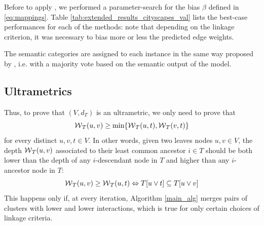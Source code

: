 Before to apply \algname{}, we performed a parameter-search for the bias $\beta$ defined in \ref{eq:mappings}. Table \ref{tab:extended_results_cityscapes_val} lists the best-case performances for each of the methods: note that depending on the \algname{} linkage criterion, it was necessary to bias more or less the predicted edge weights.

The semantic categories are assigned to each instance in the same way proposed by \cite{liu2018affinity}, i.e. with a majority vote based on the semantic output of the model.


\subsection{Ultrametrics} 
Thus, to prove that $(V, d_{T})$ is an ultrametric, we only need to prove that
\begin{equation}
\mathcal{W}{}_{T}(u,v) \geq \min \{\mathcal{W}{}_{T}(u,t), \mathcal{W}{}_{T}(v,t)\}
\end{equation}
 for every distinct $u,v,t\in V$. In other words, given two leaves nodes $u,v\in V$, the depth $\mathcal{W}{}_{T}(u,v)$ associated to their least common ancestor $i\in T$ should be both lower than the depth of any $i$-descendant node in $T$ and higher than any $i$-ancestor node in $T$:
\begin{equation}
\mathcal{W}{}_{T}(u,v) \geq \mathcal{W}{}_{T}(u,t) \Leftrightarrow T[u \vee t] \subseteq T[u \vee v] 
\end{equation}
 This happens only if, at every iteration, Algorithm \ref{main_alg} merges pairs of clusters with lower and lower interactions, which is true for only certain choices of linkage criteria. %


